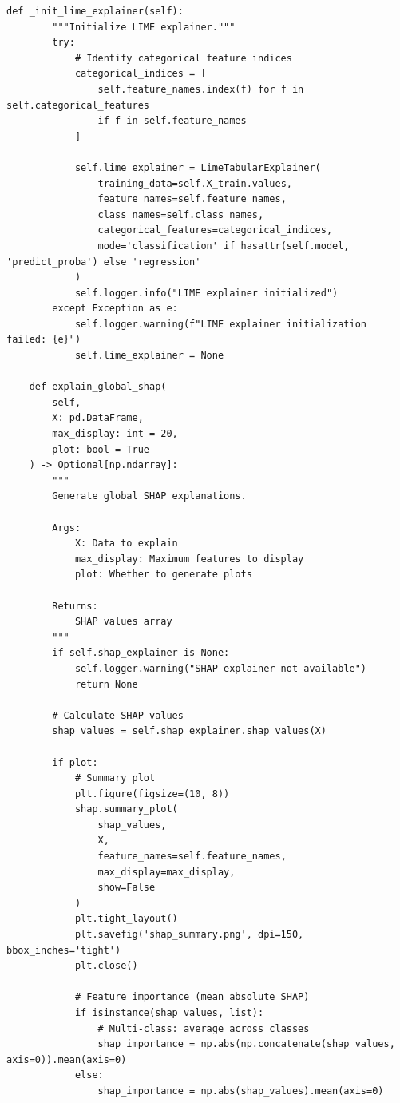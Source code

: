 \begin{lstlisting}[style=python, caption={Model Interpretability Framework with SHAP and LIME}]
    def _init_lime_explainer(self):
        """Initialize LIME explainer."""
        try:
            # Identify categorical feature indices
            categorical_indices = [
                self.feature_names.index(f) for f in self.categorical_features
                if f in self.feature_names
            ]

            self.lime_explainer = LimeTabularExplainer(
                training_data=self.X_train.values,
                feature_names=self.feature_names,
                class_names=self.class_names,
                categorical_features=categorical_indices,
                mode='classification' if hasattr(self.model, 'predict_proba') else 'regression'
            )
            self.logger.info("LIME explainer initialized")
        except Exception as e:
            self.logger.warning(f"LIME explainer initialization failed: {e}")
            self.lime_explainer = None

    def explain_global_shap(
        self,
        X: pd.DataFrame,
        max_display: int = 20,
        plot: bool = True
    ) -> Optional[np.ndarray]:
        """
        Generate global SHAP explanations.

        Args:
            X: Data to explain
            max_display: Maximum features to display
            plot: Whether to generate plots

        Returns:
            SHAP values array
        """
        if self.shap_explainer is None:
            self.logger.warning("SHAP explainer not available")
            return None

        # Calculate SHAP values
        shap_values = self.shap_explainer.shap_values(X)

        if plot:
            # Summary plot
            plt.figure(figsize=(10, 8))
            shap.summary_plot(
                shap_values,
                X,
                feature_names=self.feature_names,
                max_display=max_display,
                show=False
            )
            plt.tight_layout()
            plt.savefig('shap_summary.png', dpi=150, bbox_inches='tight')
            plt.close()

            # Feature importance (mean absolute SHAP)
            if isinstance(shap_values, list):
                # Multi-class: average across classes
                shap_importance = np.abs(np.concatenate(shap_values, axis=0)).mean(axis=0)
            else:
                shap_importance = np.abs(shap_values).mean(axis=0)


\end{lstlisting}
